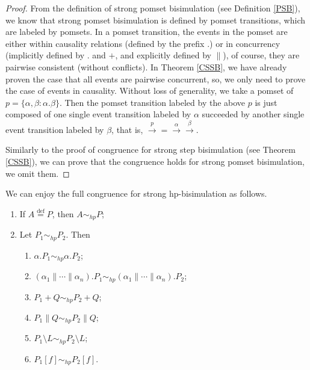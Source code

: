 \begin{proof}
From the definition of strong pomset bisimulation (see Definition \ref{PSB}), we know that strong pomset bisimulation is defined by pomset transitions, which are labeled by pomsets. In a pomset transition, the events in the pomset are either within causality relations (defined by the prefix $.$) or in concurrency (implicitly defined by $.$ and $+$, and explicitly defined by $\parallel$), of course, they are pairwise consistent (without conflicts). In Theorem \ref{CSSB}, we have already proven the case that all events are pairwise concurrent, so, we only need to prove the case of events in causality. Without loss of generality, we take a pomset of $p=\{\alpha,\beta:\alpha.\beta\}$. Then the pomset transition labeled by the above $p$ is just composed of one single event transition labeled by $\alpha$ succeeded by another single event transition labeled by $\beta$, that is, $\xrightarrow{p}=\xrightarrow{\alpha}\xrightarrow{\beta}$.

Similarly to the proof of congruence for strong step bisimulation (see Theorem \ref{CSSB}), we can prove that the congruence holds for strong pomset bisimulation, we omit them.
\end{proof}

\begin{theorem} \label{CSHPB}
We can enjoy the full congruence for strong hp-bisimulation as follows.
\begin{enumerate}
  \item If $A\overset{\text{def}}{=}P$, then $A\sim_{hp} P$;
  \item Let $P_1\sim_{hp} P_2$. Then
        \begin{enumerate}
           \item $\alpha.P_1\sim_{hp} \alpha.P_2$;
           \item $(\alpha_1\parallel\cdots\parallel\alpha_n).P_1\sim_{hp} (\alpha_1\parallel\cdots\parallel\alpha_n).P_2$;
           \item $P_1+Q\sim_{hp} P_2 +Q$;
           \item $P_1\parallel Q\sim_{hp} P_2\parallel Q$;
           \item $P_1\setminus L\sim_{hp} P_2\setminus L$;
           \item $P_1[f]\sim_{hp} P_2[f]$.
         \end{enumerate}
\end{enumerate}
\end{theorem}

